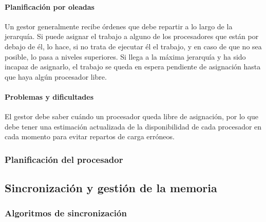 \documentclass[a4paper, 11pt, titlepage]{article}
\begin{document}
            \paragraph{Planificación por oleadas} Un gestor generalmente recibe órdenes que debe repartir 
            a lo largo de la jerarquía. Si puede asignar el trabajo a alguno de los procesadores que están 
            por debajo de él, lo hace, si no trata de ejecutar él el trabajo, y en caso de que no sea 
            posible, lo pasa a niveles superiores. Si llega a la máxima jerarquía y ha sido incapaz de 
            asignarlo, el trabajo se queda en espera pendiente de asignación hasta que haya algún procesador 
            libre.

            \paragraph{Problemas y dificultades} El gestor debe saber cuándo un procesador queda libre de 
            asignación, por lo que debe tener una estimación actualizada de la disponibilidad de cada 
            procesador en cada momento para evitar repartos de carga erróneos.

        \subsubsection{Planificación del procesador}

    \subsection{Sincronización y gestión de la memoria}

        \subsubsection{Algoritmos de sincronización}
\end{document}
